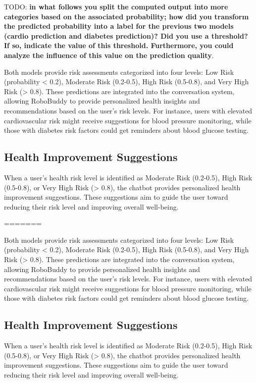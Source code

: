 \documentclass[runningheads,a4paper,11pt]{report}
\newcommand{\todoL}[1]{{\color{green} TODO: \color{green} \textbf{#1}}}
\begin{document}
\todoL{in what follows you split the computed output into more categories based on the associated probability; how did you transform the predicted probability into a label for the previous two models (cardio prediction and diabetes prediction)? Did you use a threshold? If so, indicate the value of this threshold. Furthermore, you could analyze the influence of this value on the prediction quality}.

Both models provide risk assessments categorized into four levels: Low Risk (probability < 0.2), Moderate Risk (0.2-0.5), High Risk (0.5-0.8), and Very High Risk (> 0.8). These predictions are integrated into the conversation system, allowing RoboBuddy to provide personalized health insights and recommendations based on the user's risk levels. For instance, users with elevated cardiovascular risk might receive suggestions for blood pressure monitoring, while those with diabetes risk factors could get reminders about blood glucose testing.

\subsection{Health Improvement Suggestions}

When a user's health risk level is identified as Moderate Risk (0.2-0.5), High Risk (0.5-0.8), or Very High Risk (> 0.8), the chatbot provides personalized health improvement suggestions. These suggestions aim to guide the user toward reducing their risk level and improving overall well-being.

=======

Both models provide risk assessments categorized into four levels: Low Risk (probability < 0.2), Moderate Risk (0.2-0.5), High Risk (0.5-0.8), and Very High Risk (> 0.8). These predictions are integrated into the conversation system, allowing RoboBuddy to provide personalized health insights and recommendations based on the user's risk levels. For instance, users with elevated cardiovascular risk might receive suggestions for blood pressure monitoring, while those with diabetes risk factors could get reminders about blood glucose testing.

\subsection{Health Improvement Suggestions}

When a user's health risk level is identified as Moderate Risk (0.2-0.5), High Risk (0.5-0.8), or Very High Risk (> 0.8), the chatbot provides personalized health improvement suggestions. These suggestions aim to guide the user toward reducing their risk level and improving overall well-being.
\end{document}
